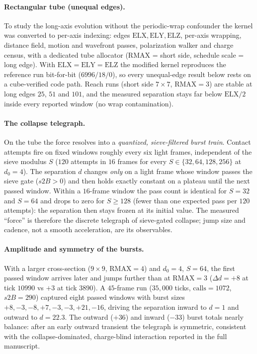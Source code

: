 \documentclass{ijuc}
\begin{document}
\paragraph{Rectangular tube (unequal edges).} To study the long-axis
evolution without the periodic-wrap confounder the kernel was converted to
per-axis indexing: edges $\mathrm{ELX},\mathrm{ELY},\mathrm{ELZ}$, per-axis
wrapping, distance field, motion and wavefront passes, polarization walker
and charge census, with a dedicated tube allocator ($\mathrm{RMAX}$ = short
side, schedule scale = long edge).  With $\mathrm{ELX}=\mathrm{ELY}
=\mathrm{ELZ}$ the modified kernel reproduces the reference run
bit-for-bit ($6996/18/0$), so every unequal-edge result below rests on a
cube-verified code path.  Reach runs (short side $7\times7$,
$\mathrm{RMAX}=3$) are stable at long edges $25$, $51$ and $101$, and the
measured separation stays far below $\mathrm{ELX}/2$ inside every reported
window (no wrap contamination).

\paragraph{The collapse telegraph.} On the tube the force resolves into a
\emph{quantized, sieve-filtered burst train}.  Contact attempts fire on
fixed windows roughly every six light frames, independent of the sieve
modulus $S$ ($120$ attempts in $16$ frames for every $S\in\{32,64,128,256\}$
at $d_0=4$).  The separation $d$ changes \emph{only} on a light frame whose
window passes the sieve gate ($s2B>0$) and then holds exactly constant on a
plateau until the next passed window.  Within a $16$-frame window the pass
count is identical for $S=32$ and $S=64$ and drops to zero for $S\ge128$
(fewer than one expected pass per $120$ attempts): the separation then stays
frozen at its initial value.  The measured ``force'' is therefore the
discrete telegraph of sieve-gated collapse; jump size and cadence, not a
smooth acceleration, are its observables.

\paragraph{Amplitude and symmetry of the bursts.} With a larger cross-section
($9\times9$, $\mathrm{RMAX}=4$) and $d_0=4$, $S=64$, the first passed window
arrives later and jumps further than at $\mathrm{RMAX}=3$ ($\Delta d=+8$ at
tick $10990$ vs $+3$ at tick $3890$).  A $45$-frame run ($35{,}000$ ticks,
$\mathrm{calls}=1072$, $s2B=290$) captured eight passed windows with burst
sizes $+8,-3,-8,+7,-3,-3,+21,-16$, driving the separation inward to $d=1$
and outward to $d=22.3$.  The outward ($+36$) and inward ($-33$) burst
totals nearly balance: after an early outward transient the telegraph is
symmetric, consistent with the collapse-dominated, charge-blind interaction
reported in the full manuscript.
\end{document}
